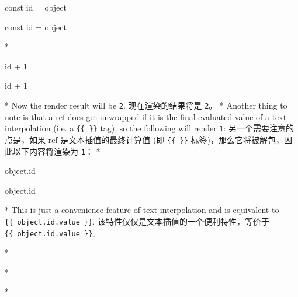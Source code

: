 \begin{paracol}{2}
\begin{codeJs}
const { id } = object
\end{codeJs}
\switchcolumn
\begin{codeJs}
const { id } = object
\end{codeJs}
\switchcolumn[0]*%
\begin{codeHtml}
{{ id + 1 }}
\end{codeHtml}
\switchcolumn
\begin{codeHtml}
{{ id + 1 }}
\end{codeHtml}
\switchcolumn[0]*%
Now the render result will be \texttt{2}.
\switchcolumn
现在渲染的结果将是 \texttt{2}。
\switchcolumn[0]*%
Another thing to note is that a ref does get unwrapped if it is the
final evaluated value of a text interpolation (i.e. a
\texttt{\{\{\ \}\}} tag), so the following will render \texttt{1}:
\switchcolumn
另一个需要注意的点是，如果 ref 是文本插值的最终计算值 (即
\texttt{\{\{\ \}\}} 标签)，那么它将被解包，因此以下内容将渲染为
\texttt{1}：
\switchcolumn[0]*%
\begin{codeHtml}
{{ object.id }}
\end{codeHtml}
\switchcolumn
\begin{codeHtml}
{{ object.id }}
\end{codeHtml}
\switchcolumn[0]*%
This is just a convenience feature of text interpolation and is
equivalent to \texttt{\{\{\ object.id.value\ \}\}}.
\switchcolumn
该特性仅仅是文本插值的一个便利特性，等价于
\texttt{\{\{\ object.id.value\ \}\}}。
\end{paracol}
 




\switchcolumn[0]*%
\begin{vueQuote}{}
\end{vueQuote} 
\switchcolumn
\begin{vueQuote}{}
\end{vueQuote} 

\switchcolumn[0]*%
\begin{codeJs}

\end{codeJs}  
\switchcolumn
\begin{codeJs}

\end{codeJs}  


\switchcolumn[0]*%
\begin{codeHtml}

\end{codeHtml}  
\switchcolumn
\begin{codeHtml}

\end{codeHtml}  